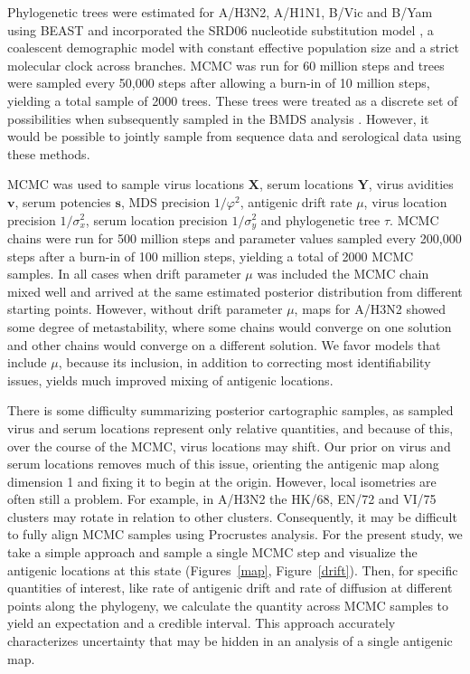 \documentclass[11pt,oneside,letterpaper]{article}
\newcommand{\viruses}{\mathbf{X}}					%
\newcommand{\sera}{\mathbf{Y}}						%
\newcommand{\ves}{\mathbf{v}}						%
\newcommand{\ses}{\mathbf{s}}						%
\newcommand{\mdssd}{\varphi}						%
\newcommand{\virussd}{\sigma_x}						%
\newcommand{\serumsd}{\sigma_y}						%
\newcommand{\drift}{\mu}							%
\newcommand{\tree}{\tau}							%
\begin{document}
Phylogenetic trees were estimated for A/H3N2, A/H1N1, B/Vic and B/Yam using BEAST \cite{BEAST17} and incorporated the SRD06 nucleotide substitution model \cite{Shapiro06}, a coalescent demographic model with constant effective population size and a strict molecular clock across branches.
MCMC was run for 60 million steps and trees were sampled every 50,000 steps after allowing a burn-in of 10 million steps, yielding a total sample of 2000 trees.
These trees were treated as a discrete set of possibilities when subsequently sampled in the BMDS analysis \cite{Pagel04}.
However, it would be possible to jointly sample from sequence data and serological data using these methods.

MCMC was used to sample virus locations $\viruses$, serum locations $\sera$, virus avidities $\ves$, serum potencies $\ses$, MDS precision $1/\mdssd^2$, antigenic drift rate $\drift$, virus location precision $1/\virussd^2$, serum location precision $1/\serumsd^2$ and phylogenetic tree $\tree$.
MCMC chains were run for 500 million steps and parameter values sampled every 200,000 steps after a burn-in of 100 million steps, yielding a total of 2000 MCMC samples.
In all cases when drift parameter $\drift$ was included the MCMC chain mixed well and arrived at the same estimated posterior distribution from different starting points.
However, without drift parameter $\drift$, maps for A/H3N2 showed some degree of metastability, where some chains would converge on one solution and other chains would converge on a different solution.
We favor models that include $\drift$, because its inclusion, in addition to correcting most identifiability issues, yields much improved mixing of antigenic locations. 

There is some difficulty summarizing posterior cartographic samples, as sampled virus and serum locations represent only relative quantities, and because of this, over the course of the MCMC, virus locations may shift.
Our prior on virus and serum locations removes much of this issue, orienting the antigenic map along dimension 1 and fixing it to begin at the origin.
However, local isometries are often still a problem.
For example, in A/H3N2 the HK/68, EN/72 and VI/75 clusters may rotate in relation to other clusters.
Consequently, it may be difficult to fully align MCMC samples using Procrustes analysis.
For the present study, we take a simple approach and sample a single MCMC step and visualize the antigenic locations at this state (Figures~\ref{map}, Figure~\ref{drift}).
Then, for specific quantities of interest, like rate of antigenic drift and rate of diffusion at different points along the phylogeny, we calculate the quantity across MCMC samples to yield an expectation and a credible interval.
This approach accurately characterizes uncertainty that may be hidden in an analysis of a single antigenic map.
\end{document}
